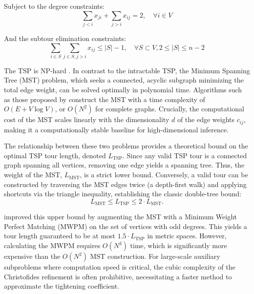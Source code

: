 \documentclass{article}
\begin{document}
Subject to the degree constraints:
\begin{equation} \label{eq:degree}
    \sum_{j < i} x_{ji} + \sum_{j > i} x_{ij} = 2, \quad \forall i \in V
\end{equation}

And the subtour elimination constraints:
\begin{equation} \label{eq:subtour}
    \sum_{i \in S} \sum_{j \in S, j > i} x_{ij} \le |S| - 1, \quad \forall S \subset V, 2 \le |S| \le n-2
\end{equation}


The TSP is NP-hard \citep{heldkarp1962}.
In contrast to the intractable TSP, the Minimum Spanning Tree (MST) problem, which seeks a connected, acyclic subgraph minimizing the total edge weight, can be solved optimally in polynomial time.
Algorithms such as those proposed by \citet{prim1957} construct the MST with a time complexity of $O(E + V \log V)$, or $O(N^2)$ for complete graphs. 
Crucially, the computational cost of the MST scales linearly with the dimensionality $d$ of the edge weights $c_{ij}$, making it a computationally stable baseline for high-dimensional inference.

The relationship between these two problems provides a theoretical bound on the optimal TSP tour length, denoted $L_{\text{TSP}}$. Since any valid TSP tour is a connected graph spanning all vertices, removing one edge yields a spanning tree. Thus, the weight of the MST, $L_{\text{MST}}$, is a strict lower bound. Conversely, a valid tour can be constructed by traversing the MST edges twice (a depth-first walk) and applying shortcuts via the triangle inequality, establishing the classic double-tree bound:
\begin{equation} \label{eq:bounds}
    L_{\text{MST}} \le L_{\text{TSP}} \le 2 \cdot L_{\text{MST}}.
\end{equation}

\citet{christofides2022worst} improved this upper bound by augmenting the MST with a Minimum Weight Perfect Matching (MWPM) on the set of vertices with odd degrees. This yields a tour length guaranteed to be at most $1.5 \cdot L_{\text{TSP}}$ in metric spaces. However, calculating the MWPM requires $O(N^3)$ time, which is significantly more expensive than the $O(N^2)$ MST construction. For large-scale auxiliary subproblems where computation speed is critical, the cubic complexity of the Christofides refinement is often prohibitive, necessitating a faster method to approximate the tightening coefficient.
\end{document}
